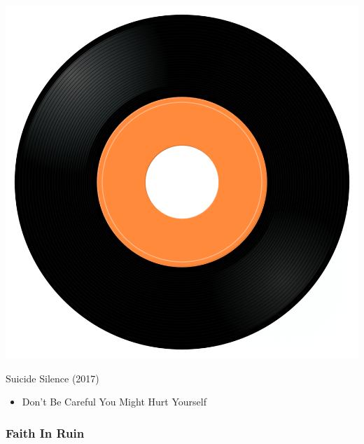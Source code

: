 \begin{minipage}[t]{0.25\textwidth}\vspace{0pt}
\captionsetup{type=figure}
\includegraphics[width=\textwidth]{Images/cover.png}
\caption*{Suicide Silence (2017)}
\end{minipage}
\begin{minipage}[t]{0.25\textwidth}\vspace{0pt}
\begin{itemize}[nosep,leftmargin=1em,labelwidth=*,align=left]
	\setlength{\itemsep}{0pt}
	\item Don't Be Careful You Might Hurt Yourself
\end{itemize}
\end{minipage}

\subsubsection{Faith In Ruin}

